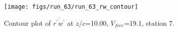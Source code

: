 \begin{figure}[H]
\centering
\texttt{[image: figs/run\_63/run\_63\_rw\_contour]}
\caption{Contour plot of $\overline{r^\prime w^\prime}$ at $z/c$=10.00, $V_{free}$=19.1, station 7.}
\label{fig:run_63_rw_contour}
\end{figure}



